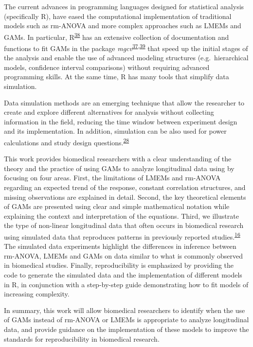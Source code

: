 \documentclass[
]{article}
\begin{document}
The current advances in programming languages designed for statistical analysis (specifically R), have eased the computational implementation of traditional models such as rm-ANOVA and more complex approaches such as LMEMs and GAMs. In particular, R\textsuperscript{\protect\hyperlink{ref-r}{38}} has an extensive collection of documentation and functions to fit GAMs in the package \emph{mgcv}\textsuperscript{\protect\hyperlink{ref-wood2017}{37},\protect\hyperlink{ref-wood2016}{39}} that speed up the initial stages of the analysis and enable the use of advanced modeling structures (e.g.~hierarchical models, confidence interval comparisons) without requiring advanced programming skills. At the same time, R has many tools that simplify data simulation.

Data simulation methods are an emerging technique that allow the researcher to create and explore different alternatives for analysis without collecting information in the field, reducing the time window between experiment design and its implementation. In addition, simulation can be also used for power calculations and study design questions.\textsuperscript{\protect\hyperlink{ref-haverkamp2017}{28}}

This work provides biomedical researchers with a clear understanding of the theory and the practice of using GAMs to analyze longitudinal data using by focusing on four areas. First, the limitations of LMEMs and rm-ANOVA regarding an expected trend of the response, constant correlation structures, and missing observations are explained in detail. Second, the key theoretical elements of GAMs are presented using clear and simple mathematical notation while explaining the context and interpretation of the equations. Third, we illustrate the type of non-linear longitudinal data that often occurs in biomedical research using simulated data that reproduces patterns in previously reported studies.\textsuperscript{\protect\hyperlink{ref-vishwanath2009}{16}} The simulated data experiments highlight the differences in inference between rm-ANOVA, LMEMs and GAMs on data similar to what is commonly observed in biomedical studies. Finally, reproducibility is emphasized by providing the code to generate the simulated data and the implementation of different models in R, in conjunction with a step-by-step guide demonstrating how to fit models of increasing complexity.

In summary, this work will allow biomedical researchers to identify when the use of GAMs instead of rm-ANOVA or LMEMs is appropriate to analyze longitudinal data, and provide guidance on the implementation of these models to improve the standards for reproducibility in biomedical research.
\end{document}

